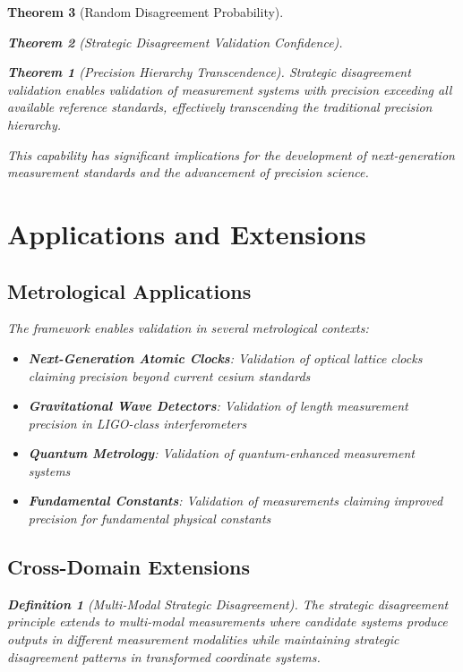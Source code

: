 \documentclass[12pt,a4paper]{article}
\newtheorem{theorem}{Theorem}
\newtheorem{definition}{Definition}
\begin{document}
\begin{theorem}[Random Disagreement Probability]
\begin{theorem}[Strategic Disagreement Validation Confidence]
\begin{theorem}[Precision Hierarchy Transcendence]
Strategic disagreement validation enables validation of measurement systems with precision exceeding all available reference standards, effectively transcending the traditional precision hierarchy.
\end{theorem}

This capability has significant implications for the development of next-generation measurement standards and the advancement of precision science.

\section{Applications and Extensions}

\subsection{Metrological Applications}

The framework enables validation in several metrological contexts:

\begin{itemize}
\item \textbf{Next-Generation Atomic Clocks}: Validation of optical lattice clocks claiming precision beyond current cesium standards
\item \textbf{Gravitational Wave Detectors}: Validation of length measurement precision in LIGO-class interferometers
\item \textbf{Quantum Metrology}: Validation of quantum-enhanced measurement systems
\item \textbf{Fundamental Constants}: Validation of measurements claiming improved precision for fundamental physical constants
\end{itemize}

\subsection{Cross-Domain Extensions}

\begin{definition}[Multi-Modal Strategic Disagreement]
The strategic disagreement principle extends to multi-modal measurements where candidate systems produce outputs in different measurement modalities while maintaining strategic disagreement patterns in transformed coordinate systems.
\end{definition}


\end{theorem}
\end{theorem}
\end{document}
